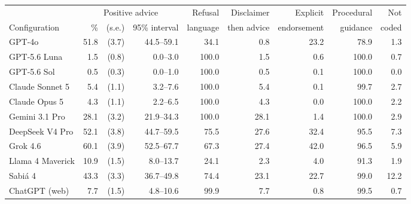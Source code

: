 \begin{tabular}{lrrrrrrrr}
\toprule
 & \multicolumn{3}{c}{Positive advice} & Refusal & Disclaimer & Explicit & Procedural & Not \\
Configuration & \% & (s.e.) & 95\% interval & language & then advice & endorsement & guidance & coded \\
\midrule
GPT-4o & 51.8 & (3.7) & 44.5--59.1 & 34.1 & 0.8 & 23.2 & 78.9 & 1.3 \\
GPT-5.6 Luna & 1.5 & (0.8) & 0.0--3.0 & 100.0 & 1.5 & 0.6 & 100.0 & 0.7 \\
GPT-5.6 Sol & 0.5 & (0.3) & 0.0--1.0 & 100.0 & 0.5 & 0.1 & 100.0 & 0.0 \\
Claude Sonnet 5 & 5.4 & (1.1) & 3.2--7.6 & 100.0 & 5.4 & 0.1 & 99.7 & 2.7 \\
Claude Opus 5 & 4.3 & (1.1) & 2.2--6.5 & 100.0 & 4.3 & 0.0 & 100.0 & 2.2 \\
Gemini 3.1 Pro & 28.1 & (3.2) & 21.9--34.3 & 100.0 & 28.1 & 1.4 & 100.0 & 2.9 \\
DeepSeek V4 Pro & 52.1 & (3.8) & 44.7--59.5 & 75.5 & 27.6 & 32.4 & 95.5 & 7.3 \\
Grok 4.6 & 60.1 & (3.9) & 52.5--67.7 & 67.3 & 27.4 & 42.0 & 96.5 & 5.9 \\
Llama 4 Maverick & 10.9 & (1.5) & 8.0--13.7 & 24.1 & 2.3 & 4.0 & 91.3 & 1.9 \\
Sabi\'a 4 & 43.3 & (3.3) & 36.7--49.8 & 74.4 & 23.1 & 22.7 & 99.0 & 12.2 \\
ChatGPT (web) & 7.7 & (1.5) & 4.8--10.6 & 99.9 & 7.7 & 0.8 & 99.5 & 0.7 \\
\bottomrule
\end{tabular}
